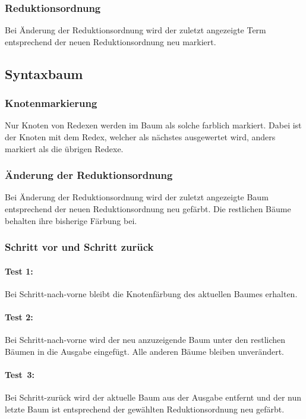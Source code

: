 \documentclass[parskip=full,11pt,openany]{scrreprt}
\begin{document}
\subsubsection{Reduktionsordnung}
Bei Änderung der Reduktionsordnung wird der zuletzt angezeigte Term entsprechend der neuen Reduktionsordnung neu markiert. 

\subsection{Syntaxbaum} \label{Baumtests}
\subsubsection{Knotenmarkierung}
Nur Knoten von Redexen werden im Baum als solche farblich markiert. Dabei ist der Knoten mit dem Redex, welcher als nächstes ausgewertet wird, anders markiert als die übrigen Redexe.

\subsubsection{Änderung der Reduktionsordnung}
Bei Änderung der Reduktionsordnung wird der zuletzt angezeigte Baum entsprechend der neuen Reduktionsordnung neu gefärbt. Die restlichen Bäume behalten ihre bisherige Färbung bei.

\subsubsection{Schritt vor und Schritt zurück}
\paragraph{Test 1:} Bei Schritt-nach-vorne bleibt die Knotenfärbung des aktuellen Baumes erhalten.

\paragraph{Test 2:} Bei Schritt-nach-vorne wird der neu anzuzeigende Baum unter den restlichen Bäumen in die Ausgabe eingefügt. Alle anderen Bäume bleiben unverändert.

\paragraph{Test\, 3:} Bei Schritt-zurück wird der aktuelle Baum aus der Ausgabe entfernt und der nun letzte Baum ist entsprechend der gewählten Reduktionsordnung neu gefärbt.
\end{document}
